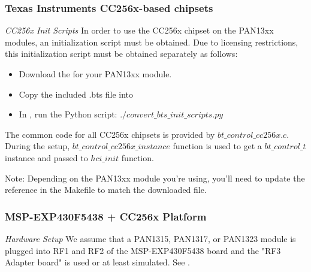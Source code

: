 \subsubsection{Texas Instruments CC256x-based chipsets}
\emph{CC256x Init Scripts} In order to use the CC256x chipset on the PAN13xx modules, an initialization script must be obtained. Due to licensing restrictions, this initialization script must be obtained separately as follows:
\begin{itemize}
\item Download the \BTSfile{} for your PAN13xx module.
\item Copy the included .bts file into 
\item In , run the Python script: $./convert\_bts\_init\_scripts.py$
\end{itemize}

The common code for all CC256x chipsets is provided by $bt\_control\_cc256x.c$. During the setup, $bt\_control\_cc256x\_instance$ function is used to get  a $bt\_control\_t$ instance and passed to $hci\_init$ function. 

Note: Depending on the PAN13xx module you're using, you'll need to update the reference  in the Makefile to match the downloaded file.

\subsubsection{MSP-EXP430F5438 + CC256x Platform}
\label{platform:msp430}
\emph{Hardware Setup} We assume that a PAN1315, PAN1317, or PAN1323 module is plugged into RF1 and RF2 of the MSP-EXP430F5438 board and the "RF3 Adapter board" is used or at least simulated. See \UserGuide{}. 
